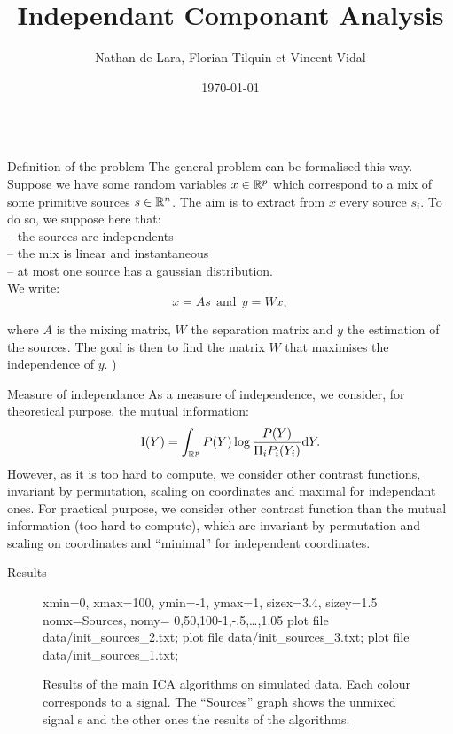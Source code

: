 \documentclass{beamer}
\title[ICA]{Independant Componant Analysis}
\author[Lara, Tilquin, Vidal]{Nathan de Lara, Florian Tilquin et Vincent Vidal}
\institute[Université Paris-Saclay]{Master Mathématiques, Vision et Apprentissage, ENS Cachan}
\date{\today}
\newcommand{\zZ}[2]{\mathrm #1\!\zp{#2}}
\begin{document}
\begin{frame}{}
	\vfill
\begin{columns}[T]
\begin{column}{.48\linewidth}
\begin{block}{Definition of the problem}
The general problem can be formalised this way.
Suppose we have some random variables $x\in\mathbb{R}^p$ which correspond to
a mix of some primitive sources $s\in\mathbb{R}^n$. The aim is to extract
from $x$ every source $s_i$. To do so, we suppose here that:\\
-- the sources are independents\\
-- the mix is linear and instantaneous\\
-- at most one source has a gaussian distribution.\\
We write:
\begin{equation}
 x = A s \ \ \mbox{and} \ \ y = W x,
\end{equation}

where $A$ is the mixing matrix, $W$ the separation matrix and $y$ the
estimation of the sources. The goal is then to find the matrix $W$ that
maximises the independence of $y$.
	 )
\end{block}
\begin{block}{Measure of independance}
As a measure of independence, we consider, for theoretical purpose,
the mutual information:\begin{equation}
\zZ IY = \int_{\zR^p} P(Y) \log\frac{P(Y)}{\Pi_i P_i(Y_i)} \zdx Y.
\end{equation}
However, as it is too hard to compute, we consider other contrast functions, invariant by permutation, scaling on coordinates and maximal for independant ones.
For practical purpose, we consider other contrast function than the
mutual information (too hard to compute), which are invariant by permutation
and scaling on coordinates and ``minimal'' for independent coordinates.
\end{block}
\begin{block}{Results}
	\begin{figure}
		\begin{mygraph}{xmin=0, xmax=100, %
				                ymin=-1, ymax=1,%
								sizex=3.4, sizey=1.5}%
								{nomx=Sources, nomy=}%
	                	{0,50,100}{-1,-.5,\ldots,1.05}%
	   plot file {data/init_sources_2.txt};
	   plot file {data/init_sources_3.txt};
	   plot file {data/init_sources_1.txt};
	\end{mygraph}
\caption{Results of the main ICA algorithms on simulated data. Each colour corresponds to a signal. The ``Sources'' graph shows the unmixed signal    s and the other ones the results of the algorithms. \label{fig:res}}
\end{figure}
\end{block}
\end{column}


\end{columns}
\end{frame}
\end{document}
